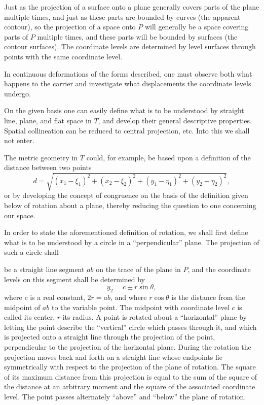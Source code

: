 \documentclass{article}
\begin{document}
Just as the projection of a surface onto a plane generally covers parts of the plane multiple times, and just as these parts are bounded by curves (the apparent contour), so the projection of a space onto $P$ will generally be a space covering parts of $P$ multiple times, and these parts will be bounded by surfaces (the contour surfaces). The coordinate levels are determined by level surfaces through points with the same coordinate level.

In continuous deformations of the forms described, one must observe both what happens to the carrier and investigate what displacements the coordinate levels undergo.

On the given basis one can easily define what is to be understood by straight line, plane, and flat space in $T$, and develop their general descriptive properties. Spatial collineation can be reduced to central projection, etc. Into this we shall not enter.

The metric geometry in $T$ could, for example, be based upon a definition of the distance between two points
\[
d = \sqrt{(x_1 - \xi_1)^2 + (x_2 - \xi_2)^2 + (y_1 - \eta_1)^2 + (y_2 - \eta_2)^2},
\]
or by developing the concept of congruence on the basis of the definition given below of rotation about a plane, thereby reducing the question to one concerning our space.

In order to state the aforementioned definition of rotation, we shall first define what is to be understood by a circle in a “perpendicular” plane. The projection of such a circle shall

be a straight line segment $ab$ on the trace of the plane in $P$, and the coordinate levels on this segment shall be determined by
\[
y_2 = c \pm r \sin \theta,
\]
where $c$ is a real constant, $2r = ab$, and where $r \cos \theta$ is the distance from the midpoint of $ab$ to the variable point. The midpoint with coordinate level $c$ is called its center, $r$ its radius. A point is rotated about a “horizontal” plane by letting the point describe the “vertical” circle which passes through it, and which is projected onto a straight line through the projection of the point, perpendicular to the projection of the horizontal plane. During the rotation the projection moves back and forth on a straight line whose endpoints lie symmetrically with respect to the projection of the plane of rotation. The square of its maximum distance from this projection is equal to the sum of the square of the distance at an arbitrary moment and the square of the associated coordinate level. The point passes alternately “above” and “below” the plane of rotation.
\end{document}
